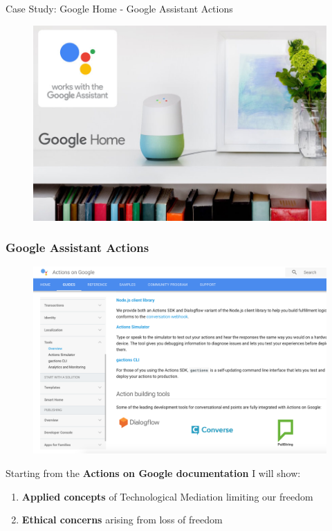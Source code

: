 \documentclass{beamer}
\begin{document}
\begin{frame}
\begin{center} 
	 Case Study: Google Home - Google Assistant Actions
\end{center}

\begin{figure}
	\centering
	\includegraphics[width=1\linewidth]{images/Google-Home1}
	\label{fig:maxresdefault}
\end{figure}

\end{frame}

\begin{frame}
\frametitle{Google Assistant Actions}
\vspace{-0.5cm}
\begin{figure}
	\centering
	\includegraphics[width=0.85\linewidth]{images/documentation_preview}
	\label{fig:documentationpreview}
\end{figure}

{\small Starting from the \textbf{Actions on Google documentation} I will show:
\begin{enumerate}
	\item \textbf{Applied concepts} of Technological Mediation limiting our freedom
	\item \textbf{Ethical concerns} arising from loss of freedom
\end{enumerate}
}

\end{frame}
\end{document}
